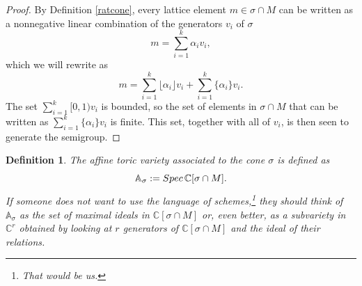 \documentclass[11pt]{article}
\numberwithin{equation}{section}
\numberwithin{footnote}{section}
\newtheorem{defn}[thm]{Definition}
\newcommand{\C}{{\mathbb C}}
\newcommand{\A}{\mathbb A}
\begin{document}
\begin{proof}
By Definition \ref{ratcone}, every lattice element $m\in \sigma\cap M$ can be written as a nonnegative linear combination
of the generators $v_i$ of $\sigma$
$$
m = \sum_{i=1}^k \alpha_i v_i,
$$
which we will rewrite as
$$
m = \sum_{i=1}^k \lfloor\alpha_i\rfloor v_i + \sum_{i=1}^k \{\alpha_i\} v_i.
$$
The set $\sum_{i=1}^k[0,1)v_i$ is bounded, so the set of elements in $\sigma\cap M$ that can be written as $\sum_{i=1}^k \{\alpha_i\} v_i$ is finite. This set, together with all of $v_i$, is then seen to generate the semigroup.
\end{proof}

\smallskip
\begin{defn}\label{affinetoric}
The affine toric variety associated to the cone $\sigma$ is defined as
$$
\A_\sigma:={\rm Spec}\,\C[\sigma \cap M].
$$
If someone does not want to use the language of schemes,\footnote{ That would be us.} they should think of $\A_\sigma$ as the set of maximal ideals in $\C[\sigma\cap M]$ or, even better, as a subvariety in $\C^r$ obtained by looking at $r$ generators of $\C[\sigma\cap M]$ and the ideal of their relations.
\end{defn}
\end{document}

